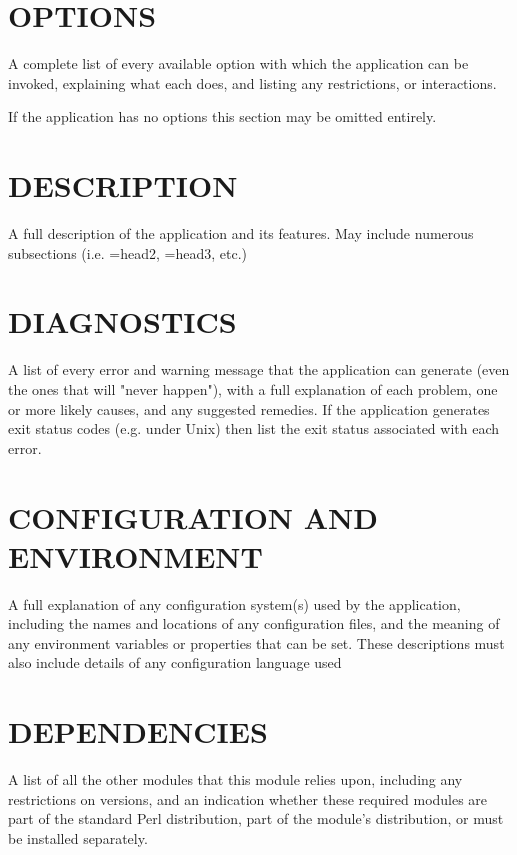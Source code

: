 \documentclass{scrartcl}
\begin{document}
\section{OPTIONS}

A complete list of every available option with which the application can be
invoked, explaining what each does, and listing any restrictions, or
interactions.

If the application has no options this section may be omitted entirely.

\section{DESCRIPTION}

A full description of the application and its features. May include
numerous subsections (i.e. =head2, =head3, etc.)

\section{DIAGNOSTICS}

A list of every error and warning message that the application can generate
(even the ones that will "never happen"), with a full explanation of each
problem, one or more likely causes, and any suggested remedies. If the
application generates exit status codes (e.g. under Unix) then list the
exit status associated with each error.

\section{CONFIGURATION AND ENVIRONMENT}

A full explanation of any configuration system(s) used by the application,
including the names and locations of any configuration files, and the
meaning of any environment variables or properties that can be set. These
descriptions must also include details of any configuration language used

\section{DEPENDENCIES}

A list of all the other modules that this module relies upon, including any
restrictions on versions, and an indication whether these required modules
are part of the standard Perl distribution, part of the module's
distribution, or must be installed separately.
\end{document}
